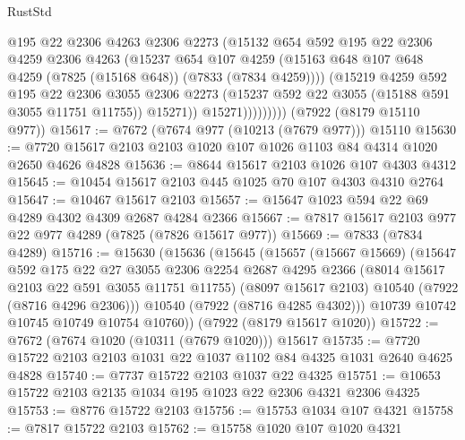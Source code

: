 \begin{lexlean}{RustStd}
\begin{coremodule}
                      @195
                      @22
                      @2306
                      @4263
                      @2306
                      @2273
                      (@15132
                        @654
                        @592
                        @195
                        @22
                        @2306
                        @4259
                        @2306
                        @4263
                        (@15237
                          @654
                          @107
                          @4259
                          (@15163 @648 @107 @648 @4259 (@7825 (@15168 @648)) (@7833 (@7834 @4259))))
                        (@15219
                          @4259
                          @592
                          @195
                          @22
                          @2306
                          @3055
                          @2306
                          @2273
                          (@15237 @592 @22 @3055 (@15188 @591 @3055 @11751 @11755))
                          @15271))
                      @15271)))))))))
    (@7922 (@8179 @15110 @977))
@15617 := @7672 (@7674 @977 (@10213 (@7679 @977))) @15110
@15630 := @7720 @15617 @2103 @2103 @1020 @107 @1026 @1103 @84 @4314 @1020 @2650 @4626 @4828
@15636 := @8644 @15617 @2103 @1026 @107 @4303 @4312
@15645 := @10454 @15617 @2103 @445 @1025 @70 @107 @4303 @4310 @2764
@15647 := @10467 @15617 @2103
@15657 := @15647 @1023 @594 @22 @69 @4289 @4302 @4309 @2687 @4284 @2366
@15667 := @7817 @15617 @2103 @977 @22 @977 @4289 (@7825 (@7826 @15617 @977))
@15669 := @7833 (@7834 @4289)
@15716 := @15630
    (@15636
      (@15645
        (@15657
          (@15667 @15669)
          (@15647
            @592
            @175
            @22
            @27
            @3055
            @2306
            @2254
            @2687
            @4295
            @2366
            (@8014 @15617 @2103 @22 @591 @3055 @11751 @11755)
            (@8097 @15617 @2103)
            @10540
            (@7922 (@8716 @4296 @2306)))
          @10540
          (@7922 (@8716 @4285 @4302)))
        @10739
        @10742
        @10745
        @10749
        @10754
        @10760))
    (@7922 (@8179 @15617 @1020))
@15722 := @7672 (@7674 @1020 (@10311 (@7679 @1020))) @15617
@15735 := @7720 @15722 @2103 @2103 @1031 @22 @1037 @1102 @84 @4325 @1031 @2640 @4625 @4828
@15740 := @7737 @15722 @2103 @1037 @22 @4325
@15751 := @10653 @15722 @2103 @2135 @1034 @195 @1023 @22 @2306 @4321 @2306 @4325
@15753 := @8776 @15722 @2103
@15756 := @15753 @1034 @107 @4321
@15758 := @7817 @15722 @2103
@15762 := @15758 @1020 @107 @1020 @4321

\end{coremodule}
\end{lexlean}
